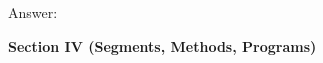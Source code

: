 \documentclass[12pt]{article}
\begin{document}
\begin{enumerate}
Answer: 

\end{enumerate}

\newpage

\noindent
{\bf Section IV (Segments, Methods, Programs)}
\end{document}
